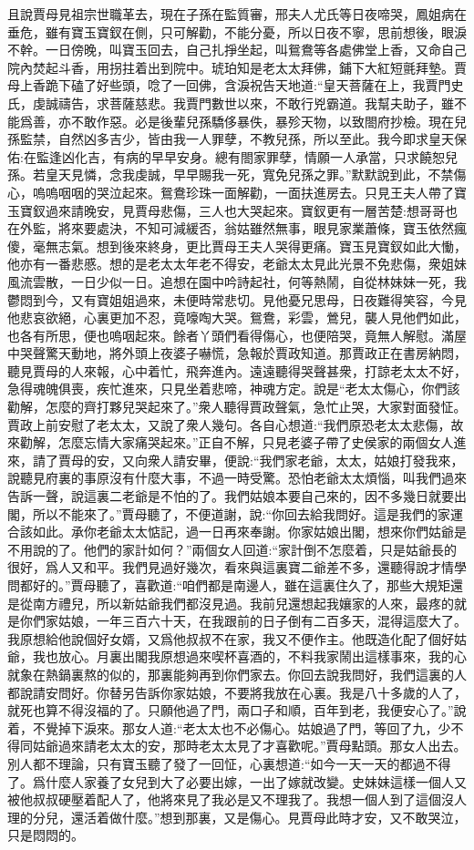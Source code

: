 \begin{parag}
    且說賈母見祖宗世職革去，現在子孫在監質審，邢夫人尤氏等日夜啼哭，鳳姐病在垂危，雖有寶玉寶釵在側，只可解勸，不能分憂，所以日夜不寧，思前想後，眼淚不幹。一日傍晚，叫寶玉回去，自己扎掙坐起，叫鴛鴦等各處佛堂上香，又命自己院內焚起斗香，用拐拄着出到院中。琥珀知是老太太拜佛，鋪下大紅短氈拜墊。賈母上香跪下磕了好些頭，唸了一回佛，含淚祝告天地道:“皇天菩薩在上，我賈門史氏，虔誠禱告，求菩薩慈悲。我賈門數世以來，不敢行兇霸道。我幫夫助子，雖不能爲善，亦不敢作惡。必是後輩兒孫驕侈暴佚，暴殄天物，以致閤府抄檢。現在兒孫監禁，自然凶多吉少，皆由我一人罪孽，不教兒孫，所以至此。我今即求皇天保佑:在監逢凶化吉，有病的早早安身。總有閤家罪孽，情願一人承當，只求饒恕兒孫。若皇天見憐，念我虔誠，早早賜我一死，寬免兒孫之罪。”默默說到此，不禁傷心，嗚嗚咽咽的哭泣起來。鴛鴦珍珠一面解勸，一面扶進房去。只見王夫人帶了寶玉寶釵過來請晚安，見賈母悲傷，三人也大哭起來。寶釵更有一層苦楚:想哥哥也在外監，將來要處決，不知可減緩否，翁姑雖然無事，眼見家業蕭條，寶玉依然瘋傻，毫無志氣。想到後來終身，更比賈母王夫人哭得更痛。寶玉見寶釵如此大慟，他亦有一番悲慼。想的是老太太年老不得安，老爺太太見此光景不免悲傷，衆姐妹風流雲散，一日少似一日。追想在園中吟詩起社，何等熱鬧，自從林妹妹一死，我鬱悶到今，又有寶姐姐過來，未便時常悲切。見他憂兄思母，日夜難得笑容，今見他悲哀欲絕，心裏更加不忍，竟嚎啕大哭。鴛鴦，彩雲，鶯兒，襲人見他們如此，也各有所思，便也嗚咽起來。餘者丫頭們看得傷心，也便陪哭，竟無人解慰。滿屋中哭聲驚天動地，將外頭上夜婆子嚇慌，急報於賈政知道。那賈政正在書房納悶，聽見賈母的人來報，心中着忙，飛奔進內。遠遠聽得哭聲甚衆，打諒老太太不好，急得魂魄俱喪，疾忙進來，只見坐着悲啼，神魂方定。說是“老太太傷心，你們該勸解，怎麼的齊打夥兒哭起來了。”衆人聽得賈政聲氣，急忙止哭，大家對面發怔。賈政上前安慰了老太太，又說了衆人幾句。各自心想道:“我們原恐老太太悲傷，故來勸解，怎麼忘情大家痛哭起來。”正自不解，只見老婆子帶了史侯家的兩個女人進來，請了賈母的安，又向衆人請安畢，便說:“我們家老爺，太太，姑娘打發我來，說聽見府裏的事原沒有什麼大事，不過一時受驚。恐怕老爺太太煩惱，叫我們過來告訴一聲，說這裏二老爺是不怕的了。我們姑娘本要自己來的，因不多幾日就要出閣，所以不能來了。”賈母聽了，不便道謝，說:“你回去給我問好。這是我們的家運合該如此。承你老爺太太惦記，過一日再來奉謝。你家姑娘出閣，想來你們姑爺是不用說的了。他們的家計如何？”兩個女人回道:“家計倒不怎麼着，只是姑爺長的很好，爲人又和平。我們見過好幾次，看來與這裏寶二爺差不多，還聽得說才情學問都好的。”賈母聽了，喜歡道:“咱們都是南邊人，雖在這裏住久了，那些大規矩還是從南方禮兒，所以新姑爺我們都沒見過。我前兒還想起我孃家的人來，最疼的就是你們家姑娘，一年三百六十天，在我跟前的日子倒有二百多天，混得這麼大了。我原想給他說個好女婿，又爲他叔叔不在家，我又不便作主。他既造化配了個好姑爺，我也放心。月裏出閣我原想過來喫杯喜酒的，不料我家鬧出這樣事來，我的心就象在熱鍋裏熬的似的，那裏能夠再到你們家去。你回去說我問好，我們這裏的人都說請安問好。你替另告訴你家姑娘，不要將我放在心裏。我是八十多歲的人了，就死也算不得沒福的了。只願他過了門，兩口子和順，百年到老，我便安心了。”說着，不覺掉下淚來。那女人道:“老太太也不必傷心。姑娘過了門，等回了九，少不得同姑爺過來請老太太的安，那時老太太見了才喜歡呢。”賈母點頭。那女人出去。別人都不理論，只有寶玉聽了發了一回怔，心裏想道:“如今一天一天的都過不得了。爲什麼人家養了女兒到大了必要出嫁，一出了嫁就改變。史妹妹這樣一個人又被他叔叔硬壓着配人了，他將來見了我必是又不理我了。我想一個人到了這個沒人理的分兒，還活着做什麼。”想到那裏，又是傷心。見賈母此時才安，又不敢哭泣，只是悶悶的。

\end{parag}
